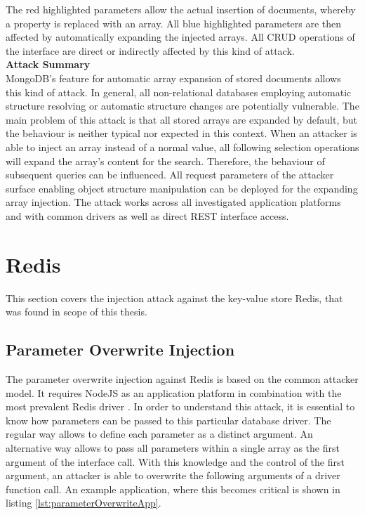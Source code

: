 The red highlighted parameters allow the actual insertion of documents, whereby a property is replaced with an array. All blue highlighted parameters are then affected by automatically expanding the injected arrays. All CRUD operations of the interface are direct or indirectly affected by this kind of attack. \\

\textbf{Attack Summary} \\
MongoDB's feature for automatic array expansion of stored documents allows this kind of attack. In general, all non-relational databases employing automatic structure resolving or automatic structure changes are potentially vulnerable. The main problem of this attack is that all stored arrays are expanded by default, but the behaviour is neither typical nor expected in this context. When an attacker is able to inject an array instead of a normal value, all following selection operations will expand the array's content for the search. Therefore, the behaviour of subsequent queries can be influenced. All request parameters of the attacker surface enabling object structure manipulation can be deployed for the expanding array injection. The attack works across all investigated application platforms and with common drivers as well as direct REST interface access. 

\section{Redis}
This section covers the injection attack against the key-value store Redis, that was found in scope of this thesis.

\subsection{Parameter Overwrite Injection}
The parameter overwrite injection against Redis is based on the common attacker model. It requires NodeJS as an application platform in combination with the most prevalent Redis driver \cite{Ranney2016}. In order to understand this attack, it is essential to know how parameters can be passed to this particular database driver. The regular way allows to define each parameter as a distinct argument. An alternative way allows to pass all parameters within a single array as the first argument of the interface call. With this knowledge and the control of the first argument, an attacker is able to overwrite the following arguments of a driver function call. An example application, where this becomes critical is shown in listing \ref{lst:parameterOverwriteApp}. \\

